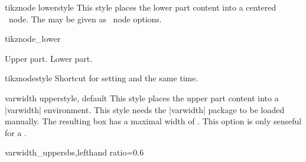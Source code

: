\begin{docTcbKey}{tikznode lower}{}{style}
  This style places the lower part content into a centered
  \tikzname\ node. The  may be given as \tikzname\  node options.
\begin{exdispExample}{tikznode_lower}
\begin{tcolorbox}[bicolor,colback=LightBlue!50!white,colbacklower=white,
  colframe=black,tikznode lower={inner sep=2pt,draw=red,fill=yellow}]
Upper part.
\tcblower
Lower part.
\end{tcolorbox}
\end{exdispExample}
\end{docTcbKey}

\begin{docTcbKey}{tikznode}{}{style}
  Shortcut for setting  and 
  the same time.
\end{docTcbKey}


\begin{docTcbKey}{varwidth upper}{}{style, default }
  This style places the upper part content into a |varwidth| environment.
  This style needs the |varwidth| package \cite{arseneau:2011a} to be loaded manually.
  The resulting box has a maximal width of .
  This option is only senseful for a .
\begin{exdispExample*}{varwidth_upper}{sbs,lefthand ratio=0.6}

\end{exdispExample*}
\end{docTcbKey}

\clearpage

